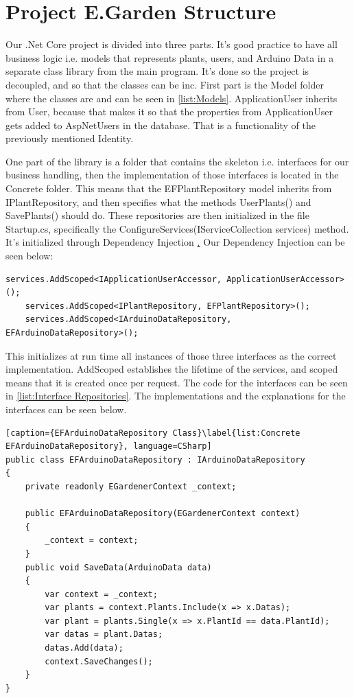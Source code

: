 \documentclass[a4paper,12pt,twoside,openright,titlepage]{book}
\begin{document}
\section{Project E.Garden Structure}
Our .Net Core project is divided into three parts. It's good practice to have all business logic i.e. models that represents plants, users, and Arduino Data in a separate class library from the main program. It's done so the project is decoupled, and so that the classes can be inc. First part is the Model folder where the classes are and can be seen in \ref{list:Models}. ApplicationUser inherits from User, because that makes it so that the properties from ApplicationUser gets added to AspNetUsers in the database. That is a functionality of the previously mentioned Identity. 

One part of the library is a folder that contains the skeleton i.e. interfaces for our business handling, then the implementation of those interfaces is located in the Concrete folder. This means that the EFPlantRepository model inherits from IPlantRepository, and then specifies what the methods UserPlants() and SavePlants() should do. These repositories are then initialized in the file Startup.cs, specifically the ConfigureServices(IServiceCollection services) method. It's initialized through Dependency Injection \href{https://docs.microsoft.com/en-us/aspnet/core/fundamentals/dependency-injection?view=aspnetcore-2.2}. Our Dependency Injection can be seen below:

\label{list:DpInjection}
\begin{lstlisting}[caption={Dependency Injection}, language=CSharp]
	services.AddScoped<IApplicationUserAccessor, ApplicationUserAccessor>();
	services.AddScoped<IPlantRepository, EFPlantRepository>();
    services.AddScoped<IArduinoDataRepository, EFArduinoDataRepository>();
\end{lstlisting}

This initializes at run time all instances of those three interfaces as the correct implementation. AddScoped establishes the lifetime of the services, and scoped means that it is created once per request. The code for the interfaces can be seen in \ref{list:Interface Repositories}. The implementations and the explanations for the interfaces can be seen below.

\begin{lstlisting}[caption={EFArduinoDataRepository Class}\label{list:Concrete EFArduinoDataRepository}, language=CSharp]
public class EFArduinoDataRepository : IArduinoDataRepository
{
	private readonly EGardenerContext _context;
        
	public EFArduinoDataRepository(EGardenerContext context)
	{
        _context = context;
	}
	public void SaveData(ArduinoData data)
	{
		var context = _context;
		var plants = context.Plants.Include(x => x.Datas);
	    var plant = plants.Single(x => x.PlantId == data.PlantId);
        var datas = plant.Datas;
        datas.Add(data);
		context.SaveChanges();
	}
}
\end{lstlisting}
\end{document}
